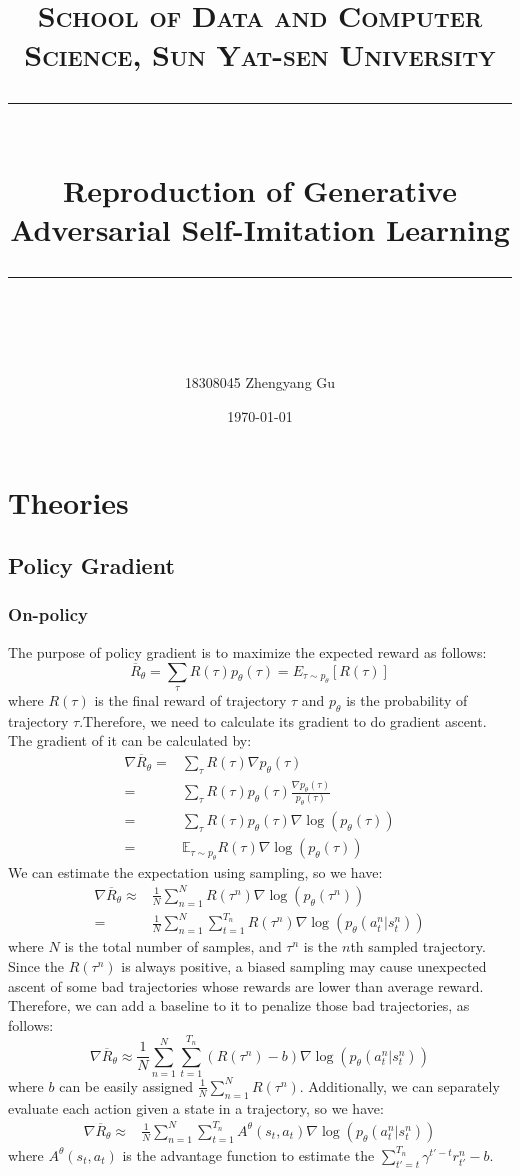 \documentclass[UTF8, a4paper, 11pt]{article}
\title{	
\normalfont \normalsize
\textsc{School of Data and Computer Science, Sun Yat-sen University} \\ [25pt] %
\rule{\textwidth}{0.5pt} \\[0.4cm] %
\huge Reproduction of Generative Adversarial Self-Imitation Learning\\ %
\rule{\textwidth}{2pt} \\[0.5cm] %
\author{18308045 Zhengyang Gu}
\date{\normalsize\today}
}
\begin{document}
\maketitle
\tableofcontents
\newpage

\section{Theories}
\subsection{Policy Gradient}
\subsubsection{On-policy}
The purpose of policy gradient is to maximize the expected reward as follows:
$$\overline R_\theta=\sum_\tau R(\tau)p_\theta(\tau)=E_{\tau\sim p_\theta}[R(\tau)]$$
where $R(\tau)$ is the final reward of trajectory $\tau$ and $p_\theta$ is the probability of trajectory $\tau$.Therefore, we need to calculate its gradient to do
gradient ascent. The gradient of it can be calculated by:
$$\begin{aligned}
\nabla\overline R_\theta=&\sum_\tau R(\tau)\nabla p_\theta(\tau)\\
=&\sum_\tau R(\tau)p_\theta(\tau)\frac{\nabla p_\theta(\tau)}{p_\theta(\tau)}\\
=&\sum_\tau R(\tau)p_\theta(\tau)\nabla\log(p_\theta(\tau))\\
=&\mathbb{E}_{\tau\sim p_\theta} R(\tau)\nabla\log(p_\theta(\tau))
\end{aligned}$$
We can estimate the expectation using sampling, so we have:
$$\begin{aligned}
\nabla\overline R_\theta\approx&\frac1 N\sum_{n=1}^N R(\tau^n)\nabla\log(p_\theta(\tau^n))\\
=&\frac1 N\sum_{n=1}^N\sum_{t=1}^{T_n}R(\tau^n)\nabla\log(p_\theta(a_t^n|s_t^n))
\end{aligned}$$
where $N$ is the total number of samples, and $\tau^n$ is the $n$th sampled trajectory. Since the $R(\tau^n)$ is always positive, a biased sampling may cause
unexpected ascent of some bad trajectories whose rewards are lower than average reward. Therefore, we can add a baseline to it to penalize those bad trajectories,
as follows:
$$\nabla\overline R_\theta\approx\frac1 N\sum_{n=1}^N\sum_{t=1}^{T_n}(R(\tau^n)-b)\nabla\log(p_\theta(a_t^n|s_t^n))$$
where $b$ can be easily assigned $\frac1 N\sum_{n=1}^N R(\tau^n)$. Additionally, we can separately evaluate each action given a state in a trajectory, so we have:
$$\begin{aligned}
\nabla\overline R_\theta\approx&\frac1 N\sum_{n=1}^N\sum_{t=1}^{T_n}A^\theta(s_t,a_t)\nabla\log(p_\theta(a_t^n|s_t^n))
\end{aligned}$$
where $A^\theta(s_t,a_t)$ is the advantage function to estimate the $\sum_{t'=t}^{T_n}\gamma^{t'-t}r_{t'}^n-b$.
\end{document}
